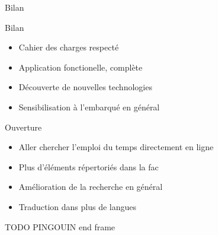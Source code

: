 \documentclass{beamer}
\begin{document}
		\begin{frame}{Bilan}
			\begin{block}{Bilan}
				\begin{itemize}
					\item Cahier des charges respecté
					\item Application fonctionelle, complète
					\item Découverte de nouvelles technologies
					\item Sensibilisation à l'embarqué en général
				\end{itemize}
			\end{block}
			\pause
			\begin{exampleblock}{Ouverture}
				\begin{itemize}
				\item Aller chercher l'emploi du temps directement en ligne
				\item Plus d'éléments répertoriés dans la fac
				\item Amélioration de la recherche en général
				\item Traduction dans plus de langues
				\end{itemize}
			\end{exampleblock}
		\end{frame}
		
		\begin{frame}{TODO PINGOUIN}
			end frame
		\end{frame}	
\end{document}
